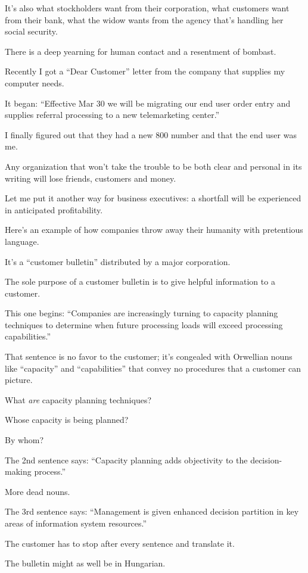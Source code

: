 \documentclass{book}
\numberwithin{equation}{section}
\begin{document}
It's also what stockholders want from their corporation, what customers want from their bank, what the widow wants from the agency that's handling her social security.

There is a deep yearning for human contact and a resentment of bombast.

Recently I got a ``Dear Customer'' letter from the company that supplies my computer needs.

It began: ``Effective Mar 30 we will be migrating our end user order entry and supplies referral processing to a new telemarketing center.''

I finally figured out that they had a new 800 number and that the end user was me.

Any organization that won't take the trouble to be both clear and personal in its writing will lose friends, customers and money.

Let me put it another way for business executives: a shortfall will be experienced in anticipated profitability.

%
Here's an example of how companies throw away their humanity with pretentious language.

It's a ``customer bulletin'' distributed by a major corporation.

The sole purpose of a customer bulletin is to give helpful information to a customer.

This one begins: ``Companies are increasingly turning to capacity planning techniques to determine when future processing loads will exceed processing capabilities.''

That sentence is no favor to the customer; it's congealed with Orwellian nouns like ``capacity'' and ``capabilities'' that convey no procedures that a customer can picture.

What \textit{are} capacity planning techniques?

Whose capacity is being planned?

By whom?

The 2nd sentence says: ``Capacity planning adds objectivity to the decision-making process.''

More dead nouns.

The 3rd sentence says: ``Management is given enhanced decision partition in key areas of information system resources.''

%
The customer has to stop after every sentence and translate it.

The bulletin might as well be in Hungarian.
\end{document}
